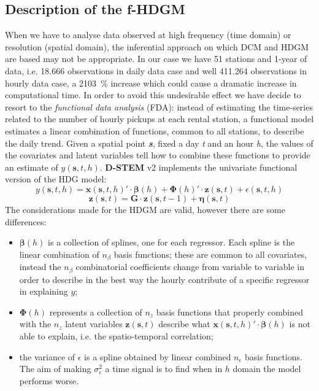 \subsection{Description of the f-HDGM}
When we have to analyse data observed at high frequency (time domain) or resolution (spatial domain), the inferential approach on which DCM and HDGM are based may not be appropriate. In our case we have \num{51} stations and \num{1}-year of data, i.e. \num{18,666} observations in daily data case and well \num{411,264} observations in hourly data case, a \SI{2103}{\percent} increase which could cause a dramatic increase in computational time. In order to avoid this undesirable effect we have decide to resort to the \textit{functional data analysis} (FDA): instead of estimating the time-series related to the number of hourly pickups at each rental station, a functional model estimates a linear combination of functions, common to all stations, to describe the daily trend. Given a spatial point \textit{\textbf{s}}, fixed a day \textit{t} and an hour \textit{h}, the values of the covariates and latent variables tell how to combine these functions to provide an estimate of $y(\boldsymbol{s}, t, h)$. \textbf{D-STEM} v\num{2} implements the univariate functional version of the HDG model:
\begin{displaymath}
	y(\boldsymbol{s}, t, h) = \boldsymbol{x}(\boldsymbol{s}, t, h)' \cdot \boldsymbol{\beta}(h) + \boldsymbol{\Phi}(h)' \cdot \boldsymbol{z}(\boldsymbol{s}, t) + \epsilon(\boldsymbol{s}, t, h)
\end{displaymath} 
\begin{displaymath}
	\boldsymbol{z}(\boldsymbol{s}, t) = \boldsymbol{G} \cdot \boldsymbol{z}(\boldsymbol{s}, t-1) + \boldsymbol{\eta}(\boldsymbol{s}, t)
\end{displaymath}
The considerations made for the HDGM are valid, however there are some differences:
\begin{itemize}
	\item $\boldsymbol{\beta}(h)$ is a collection of splines, one for each regressor. Each spline is the linear combination of $n_\beta$ basis functions; these are common to all covariates, instead the $n_\beta$ combinatorial coefficients change from variable to variable in order to describe in the best way the hourly contribute of a specific regressor in explaining $y$;
	\item $\boldsymbol{\Phi}(h)$ represents a collection of $n_z$ basis functions that properly combined with the $n_z$ latent variables 	$\boldsymbol{z}(\boldsymbol{s}, t)$ describe what $\boldsymbol{x}(\boldsymbol{s}, t, h)' \cdot \boldsymbol{\beta}(h)$ is not able to explain, i.e. the spatio-temporal correlation;
	\item the variance of $\epsilon$ is a spline obtained by linear combined $n_\epsilon$ basis functions. The aim of making $\sigma_\epsilon^2$ a time signal is to find when in $h$ domain the model performs worse.
\end{itemize}
